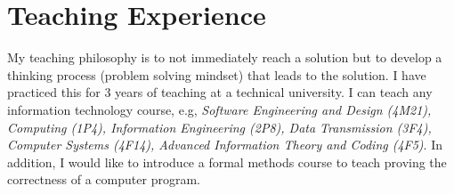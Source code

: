 \documentclass[a4paper]{article}
\begin{document}
\section{Teaching Experience}
My teaching philosophy is to not immediately reach a solution but to develop a 
thinking process (problem solving mindset) that leads to the solution. I have 
practiced this for 3 years of teaching at a technical university.
I can teach any information technology course, e.g, 
\textit{Software Engineering and Design (4M21), Computing (1P4), 
Information Engineering (2P8), Data Transmission (3F4), Computer Systems (4F14),
Advanced Information Theory and Coding (4F5)}. In addition, I would like 
to introduce a formal methods course to teach proving the correctness of a computer 
program.


 

\end{document}
